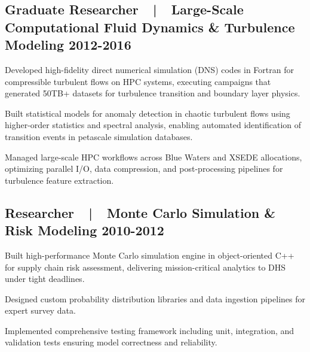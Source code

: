 \subsection{{Graduate Researcher~~|~~Large-Scale Computational Fluid Dynamics \& Turbulence Modeling \hfill 2012-2016}}
\begin{zitemize}
\item Developed high-fidelity direct numerical simulation (DNS) codes in Fortran for compressible turbulent flows on HPC systems, executing campaigns that generated 50TB+ datasets for turbulence transition and boundary layer physics.
\item Built statistical models for anomaly detection in chaotic turbulent flows using higher-order statistics and spectral analysis, enabling automated identification of transition events in petascale simulation databases.
\item Managed large-scale HPC workflows across Blue Waters and XSEDE allocations, optimizing parallel I/O, data compression, and post-processing pipelines for turbulence feature extraction.
\end{zitemize}

\subsection{{Researcher~~|~~Monte Carlo Simulation \& Risk Modeling \hfill 2010-2012}}
\begin{zitemize}
\item Built high-performance Monte Carlo simulation engine in object-oriented C++ for supply chain risk assessment, delivering mission-critical analytics to DHS under tight deadlines.
\item Designed custom probability distribution libraries and data ingestion pipelines for expert survey data.
\item Implemented comprehensive testing framework including unit, integration, and validation tests ensuring model correctness and reliability.
\end{zitemize}

